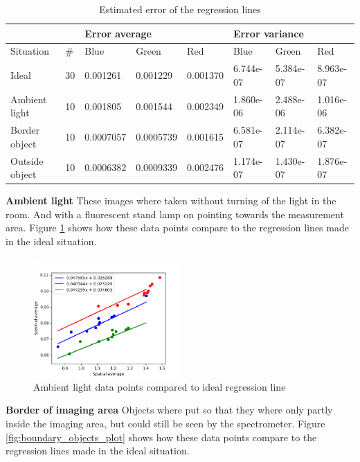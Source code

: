 \begin{table}[h]
    \centering
    \caption{Estimated error of the regression lines}
    \label{tb:error_estimate}
    \begin{tabular}{@{}llllllll@{}}
    \toprule
                   &                 & \multicolumn{3}{l}{Error average} & \multicolumn{3}{l}{Error variance} \\ \midrule
    Situation      & \#              & Blue       & Green     & Red      & Blue       & Green     & Red       \\
    Ideal          & 30              & 0.001261   & 0.001229  & 0.001370 & 6.744e-07  & 5.384e-07 & 8.963e-07 \\
    Ambient light  & 10              & 0.001805   & 0.001544  & 0.002349 & 1.860e-06  & 2.488e-06 & 1.016e-06 \\
    Border object  & 10              & 0.0007057  & 0.0005739 & 0.001615 & 6.581e-07  & 2.114e-07 & 6.382e-07 \\
    Outside object & 10              & 0.0006382  & 0.0009339 & 0.002476 & 1.174e-07  & 1.430e-07 & 1.876e-07 \\ \bottomrule
    \end{tabular}
\end{table}


\textbf{Ambient light}
These images where taken without turning of the light in the room. And with a fluorescent stand lamp on pointing towards the measurement area. Figure \ref{fig:ambient_light_plot} shows how these data points compare to the regression lines made in the ideal situation.

\begin{figure}[h]
    \centering
    \includegraphics[width=0.5\textwidth]{Plots/spectral_vs_spatial_average_with_regression_ambient_light.png}
    \caption{Ambient light data points compared to ideal regression line}
    \label{fig:ambient_light_plot}
\end{figure}

\textbf{Border of imaging area}
Objects where put so that they where only partly inside the imaging area, but could still be seen by the spectrometer. Figure \ref{fig:boundary_objects_plot} shows how these data points compare to the regression lines made in the ideal situation.

